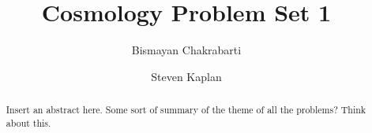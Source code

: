 \documentclass[aps,reprint,prl]{revtex4-1}
\begin{document}
\title{Cosmology Problem Set 1}
\author{Bismayan Chakrabarti}
\author{Steven Kaplan}

\begin{abstract}
Insert an abstract here. Some sort of summary of the theme of all the problems? Think about this.
\end{abstract}

\maketitle
\end{document}
